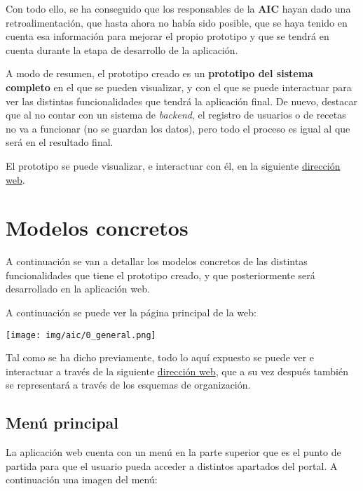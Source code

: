 \documentclass{\ClassPath/viu-tfm-template}
\begin{document}
Con todo ello, se ha conseguido que los responsables de la \textbf{AIC} hayan dado una retroalimentación, que hasta ahora no había sido posible, que se haya tenido en cuenta esa información para mejorar el propio prototipo y que se tendrá en cuenta durante la etapa de desarrollo de la aplicación.

A modo de resumen, el prototipo creado es un \textbf{prototipo del sistema completo} en el que se pueden visualizar, y con el que se puede interactuar para ver las distintas funcionalidades que tendrá la aplicación final. De nuevo, destacar que al no contar con un sistema de \textit{backend}, el registro de usuarios o de recetas no va a funcionar (no se guardan los datos), pero todo el proceso es igual al que será en el resultado final.

El prototipo se puede visualizar, e interactuar con él, en la siguiente  \href{https://yuki.github.io/VIU_03MASW/preview.html}{dirección web}.


\chapter{Modelos concretos}

A continuación se van a detallar los modelos concretos de las distintas funcionalidades que tiene el prototipo creado, y que posteriormente será desarrollado en la aplicación web.

A continuación se puede ver la página principal de la web:

\begin{center}
    \vspace{-10pt}
    \texttt{[image: img/aic/0\_general.png]}
    \vspace{-20pt}
\end{center}

Tal como se ha dicho previamente, todo lo aquí expuesto se puede ver e interactuar a través de la siguiente \href{https://yuki.github.io/VIU_03MASW/preview.html}{dirección web}, que a su vez después también se representará a través de los esquemas de organización.


\section{Menú principal}

La aplicación web cuenta con un menú en la parte superior que es el punto de partida para que el usuario pueda acceder a distintos apartados del portal. A continuación una imagen del menú:
\end{document}
